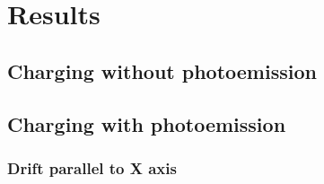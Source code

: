 \chapter{Results}
\label{sec:results}

\section{Charging without photoemission}

\section{Charging with photoemission}

\subsection*{Drift parallel to X axis}

